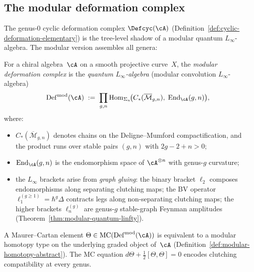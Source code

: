 \subsection{The modular deformation complex}
\label{subsec:modular-deformation-complex}

The genus-$0$ cyclic deformation complex
$\Defcyc(\cA)$ (Definition~\ref{def:cyclic-deformation-elementary})
is the tree-level shadow of a modular quantum $L_\infty$-algebra.
The modular version assembles all genera:

\begin{definition}
\label{def:modular-deformation-complex}
For a chiral algebra~$\cA$ on a smooth projective curve~$X$, the
\emph{modular deformation complex} is the \emph{quantum
$L_\infty$-algebra} (modular convolution $L_\infty$-algebra)
\begin{equation}\label{eq:modular-deformation-complex}
\operatorname{Def}^{\mathrm{mod}}(\cA)
\;:=\;
\prod_{g,n}
\operatorname{Hom}_{\Sigma_n}\!\bigl(
 C_*(\overline{\mathcal{M}}_{g,n}),\;
 \operatorname{End}_\cA(g,n)
\bigr),
\end{equation}
where:
\begin{itemize}
\item $C_*(\overline{\mathcal{M}}_{g,n})$ denotes chains on the
 Deligne--Mumford compactification, and the product runs over
 stable pairs $(g,n)$ with $2g - 2 + n > 0$;
\item $\operatorname{End}_\cA(g,n)$ is the endomorphism space of
 $\cA^{\otimes n}$ with genus-$g$ curvature;
\item the $L_\infty$ brackets arise from \emph{graph gluing}:
 the binary bracket $\ell_2$ composes endomorphisms along separating
 clutching maps; the BV operator $\ell_1^{(g \geq 1)} = \hbar^g\Delta$
 contracts legs along non-separating clutching maps; the higher
 brackets $\ell_n^{(g)}$ are genus-$g$ stable-graph Feynman amplitudes
 (Theorem~\ref{thm:modular-quantum-linfty}).
\end{itemize}
A Maurer--Cartan element
$\Theta \in
\operatorname{MC}(\operatorname{Def}^{\mathrm{mod}}(\cA))$ is
equivalent to a modular homotopy type on the underlying graded
object of~$\cA$
(Definition~\ref{def:modular-homotopy-abstract}).
The MC equation
$d\Theta + \frac{1}{2}[\Theta,\Theta] = 0$
encodes clutching compatibility at every genus.
\end{definition}

